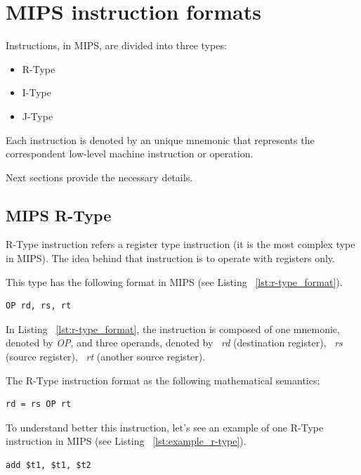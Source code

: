 \documentclass[
  oneside,
  11pt, a4paper,
  footinclude=true,
  headinclude=true,
  cleardoublepage=empty
]{scrbook}
\begin{document}
\newpage



\section{MIPS instruction formats}
\label{sec:instruction_formats_mips}

Instructions, in MIPS, are divided into three types:
\begin{itemize}
\item R-Type
\item I-Type
\item J-Type
\end{itemize}

Each instruction is denoted by an unique mnemonic that represents the correspondent low-level machine instruction or operation.

Next sections provide the necessary details.

\subsection{MIPS R-Type}

R-Type instruction refers a register type instruction (it is the most complex type in MIPS).
The idea behind that instruction is to operate with registers only.

This type has the following format in MIPS (see Listing ~\ref{lst:r-type_format}).

\begin{lstlisting}[caption={R-Type instruction format},label={lst:r-type_format}]
  OP rd, rs, rt
\end{lstlisting}

In Listing ~\ref{lst:r-type_format}, the instruction is composed of one mnemonic, denoted by \textit{OP}, and three operands, denoted by ~\textit{rd} (destination register), ~\textit{rs} (source register), ~\textit{rt} (another source register).

The R-Type instruction format as the following mathematical semantics:

\begin{lstlisting}[caption={},label={}]
  rd = rs OP rt
\end{lstlisting}

To understand better this instruction, let's see an example of one R-Type instruction in MIPS (see Listing ~\ref{lst:example_r-type}).

\begin{lstlisting}[caption={Example of a R-Type instruction},label={lst:example_r-type}]
  add $t1, $t1, $t2
\end{lstlisting}
\end{document}
